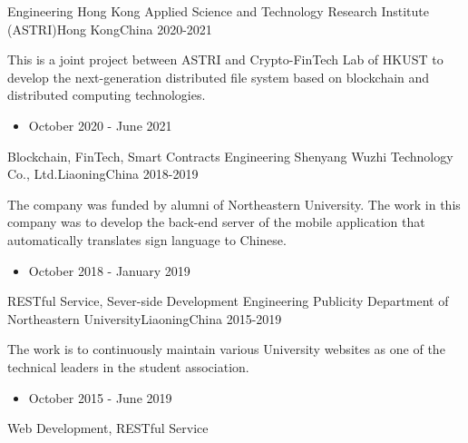 %
%
%
\begin{experiences}
	\experience
	{Engineering}   {Hong Kong Applied Science and Technology Research Institute (ASTRI)}{Hong Kong}{China}
	{2020-2021} {
		This is a joint project between ASTRI and Crypto-FinTech Lab of HKUST to develop the next-generation distributed file system based on blockchain and distributed computing technologies.
		\begin{itemize}
			\item October 2020 - June 2021
		\end{itemize}
	}
	{Blockchain, FinTech, Smart Contracts}
	\emptySeparator
	\experience
	{Engineering} {Shenyang Wuzhi Technology Co., Ltd.}{Liaoning}{China}
	{2018-2019}    {
		The company was funded by alumni of Northeastern University. The work in this company was to develop the back-end server of the mobile application that automatically translates sign language to Chinese.
		\begin{itemize}
			\item October 2018 - January 2019
		\end{itemize}
	}
	{RESTful Service, Sever-side Development}
	\emptySeparator
	\experience
	{Engineering} {Publicity Department of Northeastern University}{Liaoning}{China}
	{2015-2019}    {
		The work is to continuously maintain various University websites as one of the technical leaders in the student association.
		\begin{itemize}
			\item October 2015 - June 2019
		\end{itemize}
	}
	{Web Development, RESTful Service}
\end{experiences}

